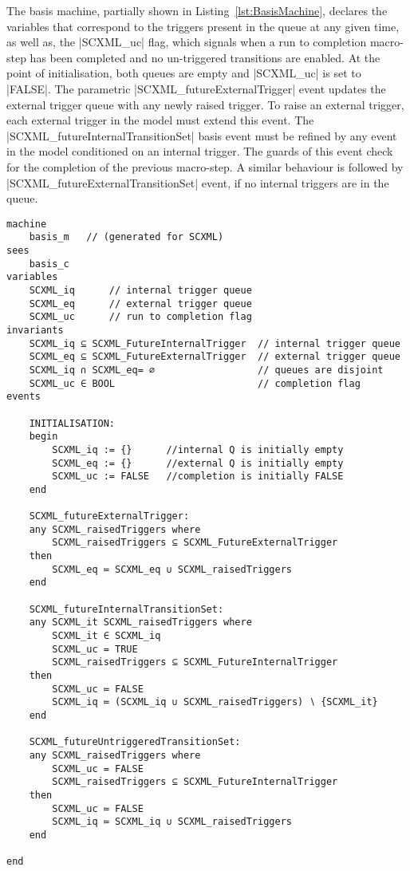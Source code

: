 The basis machine, partially shown in Listing~\ref{lst:BasisMachine}, declares the variables that correspond to the triggers present in the queue at any given time, as well as, the |SCXML_uc| flag, which signals when a run to completion macro-step has been completed and no un-triggered transitions are enabled. 
At the point of initialisation, both queues are empty and |SCXML_uc| is set to |FALSE|. 
The parametric |SCXML_futureExternalTrigger| event updates the external trigger queue with any newly raised trigger. 
To raise an external trigger, each external trigger in the model must extend this event.   
The |SCXML_futureInternalTransitionSet| basis event must be refined by any event in the model conditioned on an internal trigger. 
The guards of this event check for the completion of the previous macro-step. 
A similar behaviour is followed by |SCXML_futureExternalTransitionSet| event, if no internal triggers are in the queue.  

\begin{lstfloat}
\begin{lstlisting}[caption={Snippet of abstract basis machine}, label={lst:BasisMachine},language=Event-B, escapechar=|, frame=single]
machine 
	basis_m   // (generated for SCXML)
sees 
	basis_c 
variables
	SCXML_iq	  // internal trigger queue
	SCXML_eq	  // external trigger queue
	SCXML_uc	  // run to completion flag
invariants
	SCXML_iq ⊆ SCXML_FutureInternalTrigger	// internal trigger queue
	SCXML_eq ⊆ SCXML_FutureExternalTrigger	// external trigger queue
	SCXML_iq ∩ SCXML_eq= ∅					// queues are disjoint
	SCXML_uc ∈ BOOL							// completion flag
events

	INITIALISATION: 
	begin
		SCXML_iq := {}		//internal Q is initially empty
		SCXML_eq := {}		//external Q is initially empty
		SCXML_uc := FALSE	//completion is initially FALSE
	end

	SCXML_futureExternalTrigger: 
	any SCXML_raisedTriggers where
		SCXML_raisedTriggers ⊆ SCXML_FutureExternalTrigger 
	then
		SCXML_eq ≔ SCXML_eq ∪ SCXML_raisedTriggers 
	end

	SCXML_futureInternalTransitionSet: 
	any SCXML_it SCXML_raisedTriggers where
		SCXML_it ∈ SCXML_iq 
		SCXML_uc = TRUE 
		SCXML_raisedTriggers ⊆ SCXML_FutureInternalTrigger 
	then
		SCXML_uc ≔ FALSE 
		SCXML_iq ≔ (SCXML_iq ∪ SCXML_raisedTriggers) ∖ {SCXML_it} 
	end

	SCXML_futureUntriggeredTransitionSet: 
	any SCXML_raisedTriggers where
		SCXML_uc = FALSE
		SCXML_raisedTriggers ⊆ SCXML_FutureInternalTrigger
	then
		SCXML_uc ≔ FALSE 
		SCXML_iq ≔ SCXML_iq ∪ SCXML_raisedTriggers 
	end

end
\end{lstlisting}
\end{lstfloat}

